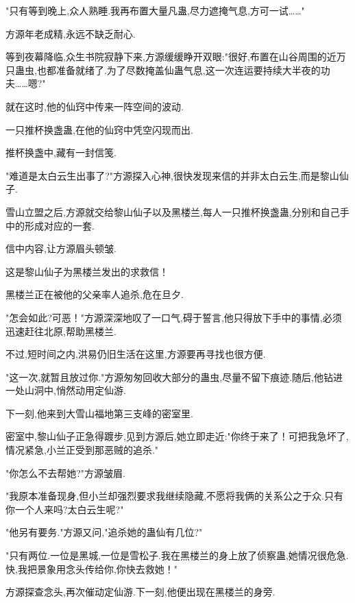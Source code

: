 \begin{this_body}
"只有等到晚上,众人熟睡.我再布置大量凡蛊,尽力遮掩气息,方可一试……"

方源年老成精,永远不缺乏耐心.

等到夜幕降临,众生书院寂静下来,方源缓缓睁开双眼:"很好,布置在山谷周围的近万只蛊虫,也都准备就绪了.为了尽数掩盖仙蛊气息,这一次连运要持续大半夜的功夫……嗯?"

就在这时,他的仙窍中传来一阵空间的波动.

一只推杯换盏蛊,在他的仙窍中凭空闪现而出.

推杯换盏中,藏有一封信笺.

"难道是太白云生出事了?"方源探入心神,很快发现来信的并非太白云生,而是黎山仙子.

雪山立盟之后,方源就交给黎山仙子以及黑楼兰,每人一只推杯换盏蛊,分别和自己手中的形成对应的一套.

信中内容,让方源眉头顿皱.

这是黎山仙子为黑楼兰发出的求救信！

黑楼兰正在被他的父亲率人追杀,危在旦夕.

"怎会如此?可恶！"方源深深地叹了一口气,碍于誓言,他只得放下手中的事情,必须迅速赶往北原,帮助黑楼兰.

不过,短时间之内,洪易仍旧生活在这里,方源要再寻找也很方便.

"这一次,就暂且放过你."方源匆匆回收大部分的蛊虫,尽量不留下痕迹.随后,他钻进一处山洞中,悄然动用定仙游.

下一刻,他来到大雪山福地第三支峰的密室里.

密室中,黎山仙子正急得踱步,见到方源后,她立即走近:"你终于来了！可把我急坏了,情况紧急,小兰正受到那恶贼的追杀."

"你怎么不去帮她?"方源皱眉.

"我原本准备现身,但小兰却强烈要求我继续隐藏,不愿将我俩的关系公之于众.只有你一个人来吗?太白云生呢?"

"他另有要务."方源又问,"追杀她的蛊仙有几位?"

"只有两位.一位是黑城,一位是雪松子.我在黑楼兰的身上放了侦察蛊,她情况很危急.快,我把景象用念头传给你,你快去救她！"

方源探查念头,再次催动定仙游.下一刻,他便出现在黑楼兰的身旁.

\end{this_body}

